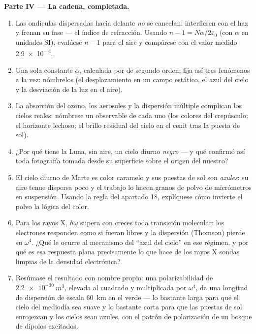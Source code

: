 \begin{problem}
\medskip\noindent\textbf{Parte IV --- La cadena, completada.}
\begin{enumerate}[resume]
  \item Las ondículas dispersadas hacia delante \emph{no} se cancelan:
        interfieren con el haz y frenan su fase --- el
        índice de refracción. Usando $n - 1 = N\alpha/2\varepsilon_0$
        (con $\alpha$ en unidades SI), evalúese $n - 1$ para el aire y
        compárese con el valor medido \num{2.9e-4}.
  \item Una sola constante $\alpha$, calculada por  de segundo orden, fija así tres fenómenos a la vez:
        nómbrelos (el desplazamiento en un campo estático, el azul del
        cielo y la desviación de la luz en el aire).
  \item La absorción del ozono, los aerosoles y la dispersión múltiple
        complican los cielos reales: nómbrese un observable de cada uno
        (los colores del crepúsculo; el horizonte lechoso; el brillo
        residual del cielo en el cenit tras la puesta de sol).
  \item ¿Por qué tiene la Luna, sin aire, un cielo diurno \emph{negro}
        --- y qué confirmó así toda fotografía tomada desde su superficie
        sobre el origen del nuestro?
  \item El cielo diurno de Marte es color caramelo y sus puestas de sol
        son \emph{azules}: su aire tenue dispersa poco y el trabajo lo
        hacen granos de polvo de micrómetros en suspensión. Usando la
        regla del apartado 18, explíquese cómo invierte el polvo la lógica
        del color.
  \item Para los rayos X, $\hbar\omega$ supera con creces toda transición
        molecular: los electrones responden como si fueran libres y la
        dispersión (Thomson) pierde su $\omega^4$. ¿Qué le ocurre al
        mecanismo del ``azul del cielo'' en ese régimen, y por qué es esa
        respuesta plana precisamente lo que hace de los rayos X sondas
        limpias de la densidad electrónica?
  \item Resúmase el resultado con nombre propio: una polarizabilidad de
        $\qty{2.2e-30}{m^3}$, elevada al cuadrado y multiplicada por
        $\omega^4$, da una longitud de dispersión de escala \qty{60}{km}
        en el verde --- lo bastante larga para que el cielo del mediodía
        sea suave y lo bastante corta para que las puestas de sol
        enrojezcan y los cielos sean azules, con el patrón de polarización
        de un bosque de dipolos excitados.
\end{enumerate}
\end{problem}
